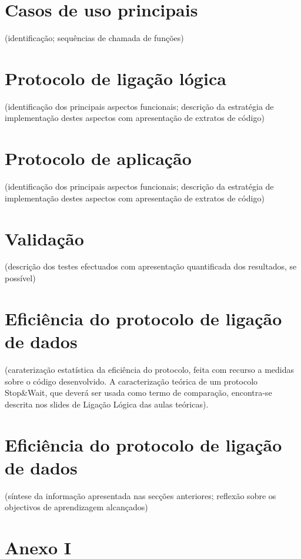 \documentclass[a4paper]{article}
\begin{document}
\newpage

\section{Casos de uso principais}

(identificação; sequências de chamada de funções)
\newpage

\section{Protocolo de ligação lógica}

  (identificação dos principais aspectos funcionais; descrição da estratégia de implementação destes aspectos com apresentação de extratos de código)
\newpage

\section{Protocolo de aplicação}

  (identificação dos principais aspectos funcionais; descrição da estratégia de implementação destes aspectos com apresentação de extratos de código)
\newpage

\section{Validação}

   (descrição dos testes efectuados com apresentação quantificada dos resultados, se possível)
\newpage

\section{Eficiência do protocolo de ligação de dados}

   (caraterização estatística da  eficiência do protocolo, feita com recurso a medidas sobre o código desenvolvido. A caracterização teórica de um protocolo Stop\&Wait, que deverá ser usada como termo de comparação, encontra-se descrita nos slides de Ligação Lógica das aulas teóricas). 
\newpage

\section{Eficiência do protocolo de ligação de dados}

  (síntese da informação apresentada nas secções anteriores; reflexão sobre os objectivos de aprendizagem alcançados)
\newpage

\section{Anexo I}
\begin{lstlisting}[language=C]


\end{lstlisting}
\end{document}
